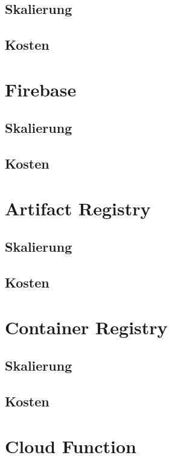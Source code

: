 \subsection{Skalierung}
\blindtext

\subsection{Kosten}
\sblindtext


\section{Firebase}
\blindtext

\subsection{Skalierung}
\blindtext

\subsection{Kosten}
\sblindtext


\section{Artifact Registry}
\blindtext

\subsection{Skalierung}
\blindtext

\subsection{Kosten}
\sblindtext


\section{Container Registry}
\blindtext

\subsection{Skalierung}
\blindtext

\subsection{Kosten}
\sblindtext


\section{Cloud Function}
\blindtext

